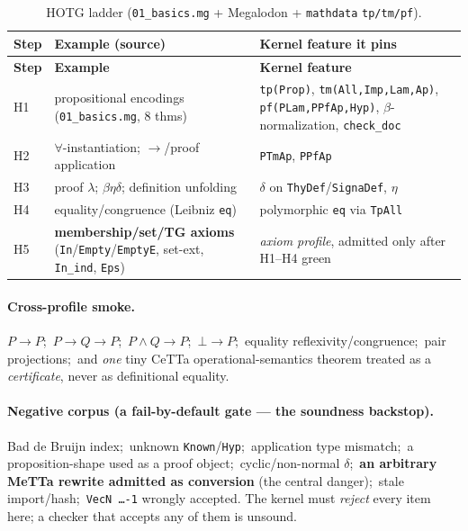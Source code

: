\documentclass[11pt]{article}
\newcommand{\MeTTa}{MeTTa}
\newcommand{\CeTTa}{CeTTa}
\newcommand{\HOTG}{HOTG}
\newcommand{\code}[1]{\texttt{#1}}
\begin{document}
\begin{longtable}{@{}>{\raggedright\arraybackslash}p{}
                       >{\raggedright\arraybackslash}p{}
                       >{\raggedright\arraybackslash}p{}@{}}
\caption{\HOTG{} ladder (\code{01\_basics.mg} + Megalodon + \code{mathdata} \code{tp/tm/pf}).}\\
\toprule
\textbf{Step} & \textbf{Example (source)} & \textbf{Kernel feature it pins}\\
\midrule
\endfirsthead
\toprule \textbf{Step} & \textbf{Example} & \textbf{Kernel feature}\\ \midrule
\endhead
H1 & propositional encodings (\code{01\_basics.mg}, 8 thms) & \code{tp(Prop)}, \code{tm(All,Imp,Lam,Ap)}, \code{pf(PLam,PPfAp,Hyp)}, $\beta$-normalization, \code{check\_doc}\\
H2 & $\forall$-instantiation; $\to$/proof application & \code{PTmAp}, \code{PPfAp}\\
H3 & proof $\lambda$; $\beta\eta\delta$; definition unfolding & $\delta$ on \code{ThyDef}/\code{SignaDef}, $\eta$\\
H4 & equality/congruence (Leibniz \code{eq}) & polymorphic \code{eq} via \code{TpAll}\\
H5 & \textbf{membership/set/TG axioms} (\code{In}/\code{Empty}/\code{EmptyE}, set-ext, \code{In\_ind}, \code{Eps}) & \emph{axiom profile}, admitted only after H1--H4 green\\
\bottomrule
\end{longtable}

\paragraph{Cross-profile smoke.} $P\to P$;\ $P\to Q\to P$;\ $P\wedge Q\to P$;\
$\bot\to P$;\ equality reflexivity/congruence;\ pair projections;\ and \emph{one}
tiny \CeTTa{} operational-semantics theorem treated as a \emph{certificate}, never
as definitional equality.

\paragraph{Negative corpus (a fail-by-default gate --- the soundness backstop).}
Bad de Bruijn index;\ unknown \code{Known}/\code{Hyp};\ application type mismatch;\
a proposition-shape used as a proof object;\ cyclic/non-normal $\delta$;\
\textbf{an arbitrary \MeTTa{} rewrite admitted as conversion} (the central danger);\
stale import/hash;\ \code{VecN \dots -1} wrongly accepted. The kernel must
\emph{reject} every item here; a checker that accepts any of them is unsound.
\end{document}
